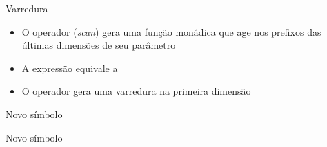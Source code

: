 \begin{frame}[fragile]{Varredura}

    \begin{itemize}
        \item O operador  (\textit{scan}) gera uma função monádica que age nos
            prefixos das últimas dimensões de seu parâmetro
        \pause

        \item A expressão  equivale a 
        \pause

        \item O operador  gera uma varredura na primeira dimensão
    \end{itemize}
\end{frame}

\begin{frame}[fragile]{Novo símbolo}
\end{frame}

\begin{frame}[fragile]{Novo símbolo}

\end{frame}

